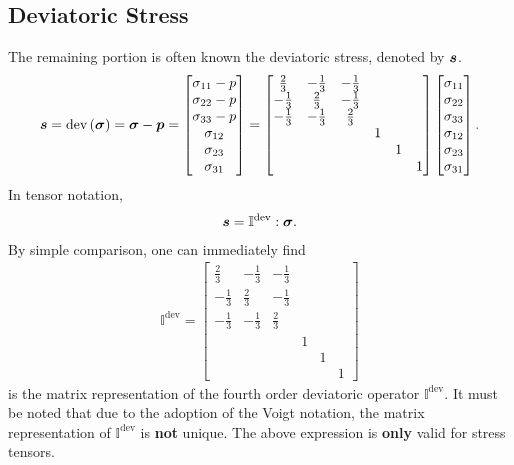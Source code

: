 \subsection{Deviatoric Stress}
The remaining portion is often known the deviatoric stress, denoted by $\bm{s}$.
\begin{gather}
\bm{s}=\text{dev}\left(\bm{\sigma}\right)=\bm{\sigma}-\bm{p}=\begin{bmatrix}
\sigma_{11}-p\\\sigma_{22}-p\\\sigma_{33}-p\\\sigma_{12}\\\sigma_{23}\\\sigma_{31}
\end{bmatrix}=\begin{bmatrix}
\frac{2}{3}&-\frac{1}{3}&-\frac{1}{3}&&&\\
-\frac{1}{3}&\frac{2}{3}&-\frac{1}{3}&&&\\
-\frac{1}{3}&-\frac{1}{3}&\frac{2}{3}&&&\\
&&&1&&\\
&&&&1&\\
&&&&&1
\end{bmatrix}\begin{bmatrix}
\sigma_{11}\\\sigma_{22}\\\sigma_{33}\\\sigma_{12}\\\sigma_{23}\\\sigma_{31}
\end{bmatrix}.
\end{gather}
In tensor notation,
\begin{gather}
\bm{s}=\mathbb{I}^\text{dev}:\bm{\sigma}.
\end{gather}
By simple comparison, one can immediately find
\begin{gather}
\mathbb{I}^\text{dev}=\begin{bmatrix}
\frac{2}{3}&-\frac{1}{3}&-\frac{1}{3}&&&\\
-\frac{1}{3}&\frac{2}{3}&-\frac{1}{3}&&&\\
-\frac{1}{3}&-\frac{1}{3}&\frac{2}{3}&&&\\
&&&1&&\\
&&&&1&\\
&&&&&1
\end{bmatrix}
\end{gather}
is the matrix representation of the fourth order deviatoric operator $\mathbb{I}^\text{dev}$. It must be noted that due to the adoption of the Voigt notation, the matrix representation of $\mathbb{I}^\text{dev}$ is \textbf{not} unique.
The above expression is \textbf{only} valid for stress tensors.

